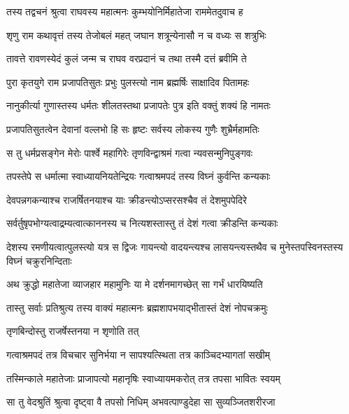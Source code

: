 
\twolineshloka
{तस्य तद्वचनं श्रुत्वा राघवस्य महात्मनः}
{कुम्भयोनिर्मिहातेजा राममेतदुवाच ह} %

\twolineshloka
{शृणु राम कथावृत्तं तस्य तेजोबलं महत्}
{जघान शत्रून्येनासौ न च वध्यः स शत्रुभिः} %

\twolineshloka
{तावत्ते रावणस्येदं कुलं जन्म च राघव}
{वरप्रदानं च तथा तस्मै दत्तं ब्रवीमि ते} %

\twolineshloka
{पुरा कृतयुगे राम प्रजापतिसुतः प्रभुः}
{पुलस्त्यो नाम ब्रह्मर्षिः साक्षादिव पितामहः} %

\twolineshloka
{नानुकीर्त्या गुणास्तस्य धर्मतः शीलतस्तथा}
{प्रजापतेः पुत्र इति वक्तुं शक्यं हि नामतः} %

\twolineshloka
{प्रजापतिसुतत्वेन देवानां वल्लभो हि सः}
{हृष्टः सर्वस्य लोकस्य गुणैः शुभ्रैर्महामतिः} %

\twolineshloka
{स तु धर्मप्रसङ्गेन मेरोः पार्श्वे महागिरेः}
{तृणविन्द्वाश्रमं गत्वा न्यवसन्मुनिपुङ्गवः} %

\twolineshloka
{तपस्तेपे स धर्मात्मा स्वाध्यायनियतेन्द्रियः}
{गत्वाश्रमपदं तस्य विघ्नं कुर्वन्ति कन्यकाः} %

\twolineshloka
{देवपन्नगकन्याश्च राजर्षितनयाश्च याः}
{क्रीडन्त्योऽप्सरसश्चैव तं देशमुपपेदिरे} %

\twolineshloka
{सर्वर्तुषृपभोग्यत्वाद्रम्यत्वात्काननस्य च}
{नित्यशस्तास्तु तं देशं गत्वा क्रीडन्ति कन्यकाः} %

\threelineshloka
{देशस्य रमणीयत्वात्पुलस्त्यो यत्र स द्विजः}
{गायन्त्यो वादयन्त्यश्च लासयन्त्यस्तथैव च}
{मुनेस्तपस्विनस्तस्य विघ्नं चक्रुरनिन्दिताः} %

\twolineshloka
{अथ क्रुद्धो महातेजा व्याजहार महामुनिः}
{या मे दर्शनमागच्छेत् सा गर्भं धारयिष्यति} %

\twolineshloka
{तास्तु सर्वाः प्रतिश्रुत्य तस्य वाक्यं महात्मनः}
{ब्रह्मशापभयाद्भीतास्तं देशं नोपचक्रमुः} %

\onelineshloka
{तृणबिन्दोस्तु राजर्षेस्तनया न शृणोति तत्} %

\twolineshloka
{गत्वाश्रमपदं तत्र विचचार सुनिर्भया}
{न सापश्यत्स्थिता तत्र काञ्चिदभ्यागतां सखीम्} %

\twolineshloka
{तस्मिन्काले महातेजाः प्राजापत्यो महानृषिः}
{स्वाध्यायमकरोत् तत्र तपसा भावितः स्वयम्} %

\twolineshloka
{सा तु वेदश्रुतिं श्रुत्वा दृष्ट्वा वै तपसो निधिम्}
{अभवत्पाण्डुदेहा सा सुव्यञ्जितशरीरजा} %

